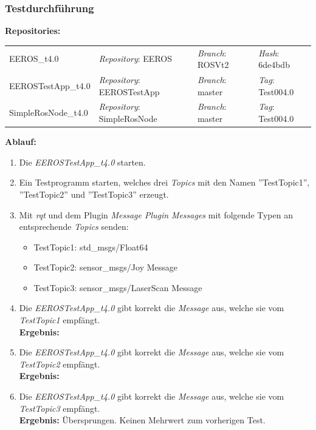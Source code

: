 \subsubsection{Testdurchführung}
\textbf{Repositories:} \\
\begin{tabular}
  { l						| l			 									l								 l								}

  EEROS\_t4.0				& \textit{Repository}: EEROS			& \textit{Branch}: ROSVt2		& \textit{Hash}: 6de4bdb 		\\
  EEROSTestApp\_t4.0		& \textit{Repository}: EEROSTestApp	& \textit{Branch}: master		& \textit{Tag}: Test004.0 		\\
  SimpleRosNode\_t4.0		& \textit{Repository}: SimpleRosNode	& \textit{Branch}: master		& \textit{Tag}: Test004.0 		\\
\end{tabular}

\textbf{Ablauf: }
\begin{enumerate}
\item Die \textit{EEROSTestApp\_t4.0} starten.
\item Ein Testprogramm starten, welches drei \textit{Topics} mit den Namen ''TestTopic1'', ''TestTopic2'' und ''TestTopic3'' erzeugt.
\item Mit \textit{rqt} und dem Plugin \textit{Message Plugin} \textit{Messages} mit folgende Typen an entsprechende \textit{Topics} senden:
  \begin{itemize}
  \item TestTopic1:	std\_msgs/Float64
  \item TestTopic2:	sensor\_msgs/Joy Message
  \item TestTopic3:	sensor\_msgs/LaserScan Message
  \end{itemize}
\item Die \textit{EEROSTestApp\_t4.0} gibt korrekt die \textit{Message} aus, welche sie vom \textit{TestTopic1} empfängt. \\
\textbf{Ergebnis:} \cmark
\item Die \textit{EEROSTestApp\_t4.0} gibt korrekt die \textit{Message} aus, welche sie vom \textit{TestTopic2} empfängt. \\
\textbf{Ergebnis:} \cmark
\item Die \textit{EEROSTestApp\_t4.0} gibt korrekt die \textit{Message} aus, welche sie vom \textit{TestTopic3} empfängt. \\
\textbf{Ergebnis:} Übersprungen. Keinen Mehrwert zum vorherigen Test.
\end{enumerate}


